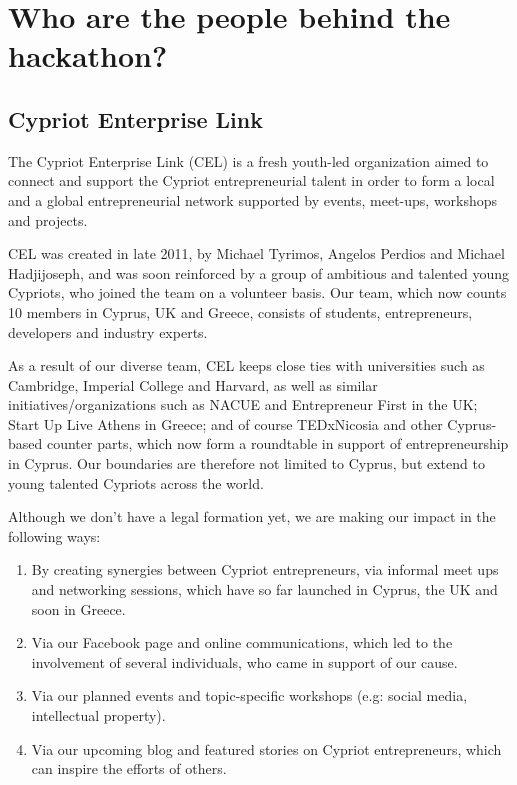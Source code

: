 \documentclass[a4paper,11pt]{report}
\begin{document}
\chapter{Who are the people behind the hackathon?}

\section{Cypriot Enterprise Link}
The Cypriot Enterprise Link (CEL) is a fresh youth-led organization aimed to connect and support the Cypriot entrepreneurial talent in order to form a local and a global entrepreneurial network supported by events, meet-ups, workshops and projects. 

CEL was created in late 2011, by Michael Tyrimos, Angelos Perdios and Michael Hadjijoseph, and was soon reinforced by a group of ambitious and talented young Cypriots, who joined the team on a volunteer basis. Our team, which now counts 10 members in Cyprus, UK and Greece, consists of students, entrepreneurs, developers and industry experts. 

As a result of our diverse team, CEL keeps close ties with universities such as Cambridge, Imperial College and Harvard, as well as similar initiatives/organizations such as NACUE and Entrepreneur First in the UK; Start Up Live Athens in Greece; and of course TEDxNicosia and other Cyprus-based counter parts, which now form a roundtable in support of entrepreneurship in Cyprus. Our boundaries are therefore not limited to Cyprus, but extend to young talented Cypriots across the world.

Although we don’t have a legal formation yet, we are making our impact in the following ways:
\begin{enumerate}
  \item By creating synergies between Cypriot entrepreneurs, via informal meet ups and networking sessions, which have so far launched in Cyprus, the UK and soon in Greece. 
  \item Via our Facebook page and online communications, which led to the involvement of several individuals, who came in support of our cause.
  \item Via our planned events and topic-specific workshops (e.g: social media, intellectual property).
  \item Via our upcoming blog and featured stories on Cypriot entrepreneurs, which can inspire the efforts of others. 
\end{enumerate}
\end{document}
